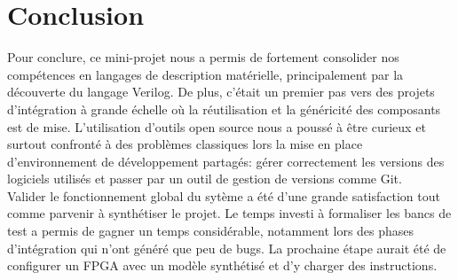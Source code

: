 \section{Conclusion}

\gap

\indent Pour conclure, ce mini-projet nous a permis de fortement consolider nos compétences en langages de description matérielle, principalement par la découverte du langage Verilog.
De plus, c'était un premier pas vers des projets d'intégration à grande échelle où la réutilisation et la généricité des composants est de mise.
L'utilisation d'outils open source nous a poussé à être curieux et surtout confronté à des problèmes classiques lors la mise en place d'environnement de développement partagés: gérer correctement les versions des logiciels utilisés et passer par un outil de gestion de versions comme Git. \\
\indent Valider le fonctionnement global du sytème a été d'une grande satisfaction tout comme parvenir à synthétiser le projet.
Le temps investi à formaliser les bancs de test a permis de gagner un temps considérable, notamment lors des phases d'intégration qui n'ont généré que peu de bugs.
La prochaine étape aurait été de configurer un FPGA avec un modèle synthétisé et d'y charger des instructions.